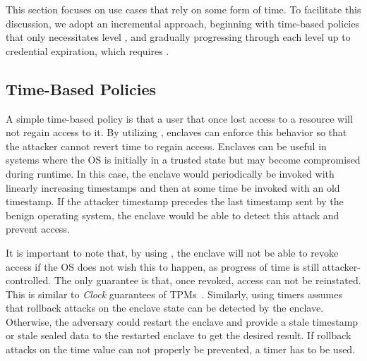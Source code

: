 \documentclass[sigplan,10pt]{acmart}
\begin{document}
This section focuses on use cases that rely on some form of time. To facilitate
this discussion, we adopt an incremental approach, beginning with time-based
policies that only necessitates level \Tone, and gradually progressing through
each level up to credential expiration, which requires \Tfour.

\subsection{Time-Based Policies}
A simple time-based policy is that a user that once lost access to a
resource will not regain access to it. By utilizing \Tone, enclaves
can enforce this behavior so that the attacker cannot revert time to
regain access. Enclaves can be useful in systems where the OS is initially in a trusted
state but may become compromised during runtime. In this case, the enclave would periodically be invoked with linearly increasing timestamps and then at some time be invoked with an old timestamp.
If the attacker timestamp precedes the last timestamp sent by the benign operating system, the 
enclave would be able to detect this attack and prevent access.

It is important to note that, by using \Tone, the enclave will not be able to
revoke access if the OS does not wish this to happen, as progress of time is
still attacker-controlled. 
The only guarantee is that, once revoked, access can
not be reinstated. This is similar to \emph{Clock} guarantees of \acp{TPM}~\cite{TPM2.0-Rev-01.59}.
Similarly, using \Tone timers assumes that rollback attacks on the enclave state can be detected by the enclave. Otherwise, the adversary could restart the enclave and provide a stale timestamp or stale sealed data to the restarted enclave to get the desired result.
If rollback attacks on the time value can not properly be prevented, a \Ttwo timer has to be used.%


\end{document}
